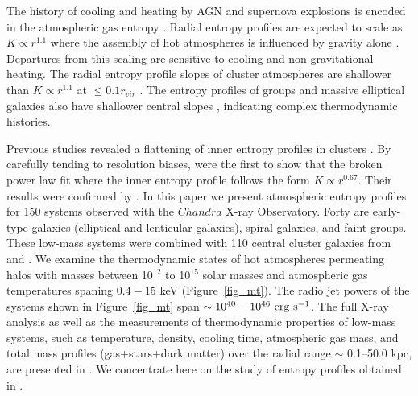 \documentclass[apjl]{emulateapj}
\begin{document}
The history of cooling and heating by AGN and supernova explosions  is encoded in the atmospheric gas entropy \citep{Voit:02, Voit:03, Voit05}. 
Radial entropy profiles are expected to scale as  $K \propto r^{1.1}$ where the assembly of hot atmospheres is influenced by gravity alone \citep{Kaiser:86, Kaiser:91, Tozzi:01, Voit:02, Voit:03, Voit:05, Voit05, Reiss:15, Babyk:16}.  Departures from this scaling are sensitive to cooling and non-gravitational heating.  The radial entropy profile slopes of cluster atmospheres are shallower than  $K \propto r^{1.1}$  at  $\leq 0.1r_{vir}$ \citep{Ponman:03, Donahue:05, Donahue:06, Pratt:06, Cavagnolo:09, Walker:12, Babyk:14, Panagoulia:14, Hogan:17a}. 
The entropy profiles of groups and massive elliptical galaxies also have shallower central slopes \citep{Werner:12, Werner:13, Voit:15}, indicating complex thermodynamic histories.

Previous studies revealed a flattening of inner entropy profiles in clusters \citep{Donahue:05, Donahue:06, Cavagnolo:09, Voit:16}.  By carefully tending to resolution biases, \citet{Panagoulia:14} were the first to show that the broken power law fit where the inner entropy profile follows the form $K \propto r^{0.67}$.  Their results were confirmed by 
\citet{Hogan:17a}.  In this paper we present atmospheric entropy profiles for 150 systems observed with the $Chandra$ X-ray Observatory.    Forty are early-type galaxies (elliptical and lenticular galaxies), spiral galaxies, and faint groups. These low-mass systems were combined with 110 central cluster galaxies from \citet{Hogan:17a} and \citet{Pulido:17}.  We examine the thermodynamic states of hot atmospheres permeating halos with masses between 10$^{12}$ to 10$^{15}$ solar masses and atmospheric gas temperatures spaning $0.4-15$ keV (Figure~\ref{fig_mt}). The radio jet powers of the systems shown in Figure~\ref{fig_mt} span $\sim 10^{40}-10^{46}~\rm erg~s^{-1}$. The full X-ray analysis as well as the measurements of thermodynamic properties of low-mass systems, such as temperature, density, cooling time, atmospheric gas mass, and total mass profiles (gas+stars+dark matter) over the radial range $\sim$ 0.1--50.0 kpc, are presented in \citet{Babyk:17prof}.   We concentrate here on the study of entropy profiles obtained in \citet{Babyk:17prof}.
\end{document}
